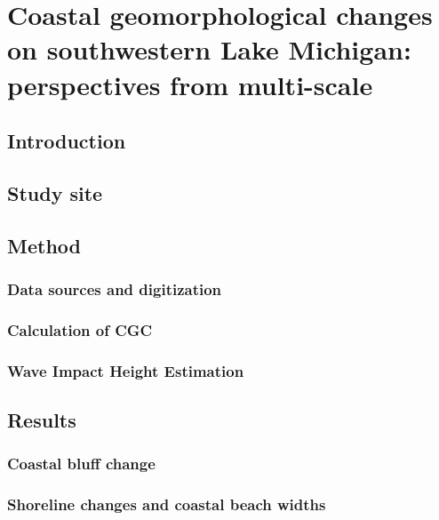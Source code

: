 \chapter{Coastal geomorphological changes on southwestern Lake Michigan: perspectives from multi-scale}
\label{Chapter2}

\section{Introduction}
\label{Introduction}

\section{Study site}
\label{Study site}

\section{Method}
\label{Method}

\subsection{Data sources and digitization}
\label{Data sources and digitization}

\subsection{Calculation of CGC}
\label{Calculation of CGC}

\subsection{Wave Impact Height Estimation}
\label{Wave Impact Height Estimation}

\section{Results}
\label{Results}

\subsection{Coastal bluff change}
\label{Coastal bluff change}

\subsection{Shoreline changes and coastal beach widths }
\label{Shoreline changes and coastal beach widths }

